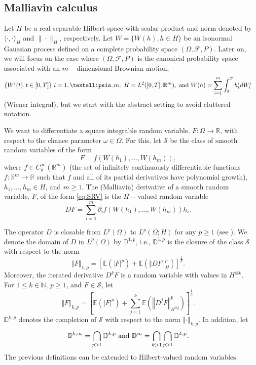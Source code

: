 \documentclass[12,english]{amsart}
\theoremstyle{plain}
\theoremstyle{definition}
\theoremstyle{plain}
\theoremstyle{plain}
\theoremstyle{remark}
\newcommand{\E}{\mathbb E}
\newcommand{\D}{\mathbb D}
\newcommand{\R}{\mathbb R}
\newcommand{\cF}{\mathcal F}
\newcommand{\cS}{\mathcal S}
\newcommand{\Om}{\Omega}
\begin{document}
\subsection{Malliavin calculus}
\label{sec:Malliavin}
Let $H$ be a real separable Hilbert space with scalar product and
norm denoted by $\langle \cdot,\cdot\rangle _H$ and
$\|\cdot\| _H$, respectively. Let $  W=\{ W(h),h\in H\} $
be an isonormal Gaussian process defined on a complete probability
space $(\Omega,\cF,P)$. Later on, we will focus on
the case where $(\Omega,\cF,P)$ is the canonical
probability space associated with an $m-$dimensional Brownian motion,
\[\{ W^i(t),t\in[0,T]\}\ i=1,\ldots,m,\
  H=L^2([0,T];\R^m),\hbox{ and }
  W(h)=\sum_{i=1}^m\int_0^Th_t^idW_t^i \]
  (Wiener integral), but we start with the abstract setting to avoid
cluttered notation.

We want to differentiate a square integrable random variable, $F:\Omega\to\R$,
with respect to the chance parameter $\omega\in\Omega$. For this,
let $\cS$ be the class of smooth random variables of the
form
\begin{equation}
F=f(W(h_1),\ldots,W(h_m)),\label{eq:SRV}
\end{equation}
where $f\in C_p^{\infty}(\R^m)$ (the set of
infinitely continuously differentiable functions $f:\R^m\to\R$
such that $f$ and all of its partial derivatives have polynomial
growth), $h_1,\ldots,h_m\in H$, and $m\geq1$. The (Malliavin)
derivative of a smooth random variable, $F$, of the form \eqref{eq:SRV}
is the $H-$valued random variable 
\[
DF=\sum_{i=1}^m\partial_if(W(h_1),\ldots,W(h_m))h_i.
\]

The operator $D$ is closable from $L^p(\Omega)$ to
$L^p(\Om;H)$ for any $p\geq1$ (see \cite[Proposition 1.2.1]{nualart2006malliavin}).
We denote the domain of $D$ in $L^p(\Omega)$ by $\D^{1,p}$,
i.e., $\D^{1,p}$ is the closure of the class $\cS$
with respect to the norm
\[
\left\Vert F\right\Vert _{1,p}=\left[\E(\left|F\right|^p)+\E(\left\Vert DF\right\Vert _H^p)\right]^{\frac1p}.
\]
Moreover, the iterated derivative $D^kF$ is a random variable with
values in $H^{\otimes k}$. For $1\leq k\in\mathbb{N}$, $p\geq1$,
and $F\in\cS$, let
\[
\left\Vert F\right\Vert _{k,p}=\left[\E(\left|F\right|^p)+\sum_{j=1}^k\E(\left\Vert D^jF\right\Vert _{H^{\otimes j}}^p)\right]^{\frac1p}.
\]
$\D^{k,p}$ denotes the completion of $\cS$ with
respect to the norm $\left\Vert \cdot\right\Vert _{k,p}$. In addition,
let 
\[
\D^{k,\infty}=\bigcap_{p>1}\D^{k,p}\hbox{ and }\D^{\infty}=\bigcap_{k>1}\bigcap_{p>1}\D^{k,p}.
\]
The previous definitions can be extended to Hilbert-valued random
variables. 
\end{document}
